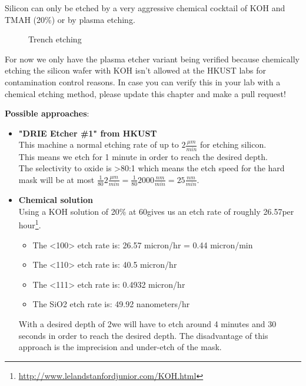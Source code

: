 Silicon can only be etched by a very aggressive chemical cocktail of  KOH and TMAH (20\%) or by plasma etching.

\begin{figure}[H]
	\centering
	\begin{tikzpicture}[node distance = 3cm, auto, thick,scale=\CrossSectionOnly, every node/.style={transform shape}]
		
	\end{tikzpicture}
	\drawStepArrow{}
	\begin{tikzpicture}[node distance = 3cm, auto, thick,scale=\CrossSectionOnly, every node/.style={transform shape}]
		
	\end{tikzpicture}
	\caption{Trench etching}
\end{figure}

\begin{mdframed}[linewidth=2pt,linecolor=red]
For now we only have the plasma etcher variant being verified because chemically etching the silicon wafer with KOH isn't allowed at the HKUST labs for contamination control reasons.
In case you can verify this in your lab with a chemical etching method, please update this chapter and make a pull request!
\end{mdframed}

\textbf{Possible approaches}:
\begin{itemize}
\item \textbf{"DRIE Etcher \#1" from HKUST} \\
This machine a normal etching rate of up to $2\frac{\mu m}{min}$ for etching silicon. \\
This means we etch for 1 minute in order to reach the desired depth. \\
The selectivity to oxide is >80:1 which means the etch speed for the hard mask will be at most $\frac{1}{80}2\frac{\mu m}{min}=\frac{1}{80}2000\frac{nm}{min}=25\frac{nm}{min}$.
\item \textbf{Chemical solution} \\
Using a KOH solution of 20\% at 60\degreesC gives us an etch rate of roughly  26.57\um per hour\footnote{\url{http://www.lelandstanfordjunior.com/KOH.html}}.
\begin{itemize}
\item The <100> etch rate is: 26.57 micron/hr = 0.44 micron/min
\item The <110> etch rate is: 40.5 micron/hr 
\item The <111> etch rate is: 0.4932 micron/hr 
\item The SiO2 etch rate is: 49.92 nanometers/hr 
\end{itemize}
With a desired depth of 2\um we will have to etch around 4 minutes and 30 seconds in order to reach the desired depth.
The disadvantage of this approach is the imprecision and under-etch of the mask.
\end{itemize}

